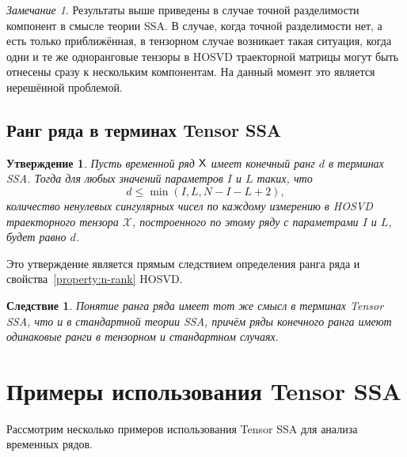 \documentclass[specialist,
    substylefile = spbu_report.rtx,
    subf,href,colorlinks=true, 12pt]{disser}
\theoremstyle{plain}
\newtheorem{statement}{Утверждение}[section]
\newtheorem{corollary}{Следствие}[statement]
\theoremstyle{definition}
\theoremstyle{remark}
\newtheorem*{remark}{Замечание}
\begin{document}
    \begin{remark}
        Результаты выше приведены в случае точной разделимости компонент в смысле теории SSA\@.
        В случае, когда точной разделимости нет, а есть только приближённая, в тензорном случае возникает такая
        ситуация, когда одни и те же одноранговые тензоры в HOSVD траекторной матрицы могут быть отнесены
        сразу к нескольким компонентам.
        На данный момент это является нерешённой проблемой.
    \end{remark}

    \subsection{Ранг ряда в терминах Tensor SSA}\label{subsec:tensor-ssa-rank}
    \begin{statement}
        Пусть временной ряд $\mathsf{X}$ имеет конечный ранг $d$ в терминах \emph{SSA}\@.
        Тогда для любых значений параметров $I$ и $L$ таких, что
        \[
            d\leqslant\min(I, L, N-I-L+2),
        \]
        количество ненулевых сингулярных чисел по каждому измерению в \emph{HOSVD} траекторного тензора $\mathcal{X}$,
        построенного по этому ряду с параметрами $I$ и $L$, будет равно $d$.
    \end{statement}
    Это утверждение является прямым следствием определения ранга ряда и свойства~\ref{property:n-rank} HOSVD\@.

    \begin{corollary}
        Понятие ранга ряда имеет тот же смысл в терминах Tensor SSA, что и в стандартной теории SSA, причём ряды конечного ранга
        имеют одинаковые ранги в тензорном и стандартном случаях.
    \end{corollary}


    \section{Примеры использования Tensor SSA}\label{sec:tensor-ssa-examples}
    Рассмотрим несколько примеров использования Tensor SSA для анализа временных рядов.
\end{document}
